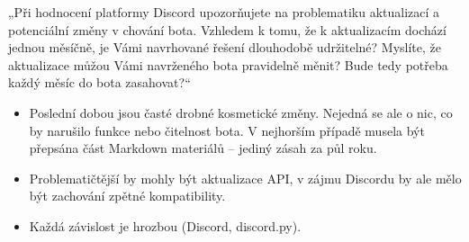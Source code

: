 \documentclass[FM]{tulpresentation}
\begin{document}
	\begin{frame}
		\bigskip
		„Při hodnocení platformy Discord upozorňujete na problematiku aktualizací a potenciální změny v chování
		bota. Vzhledem k tomu, že k aktualizacím dochází jednou měsíčně, je Vámi navrhované řešení dlouhodobě
		udržitelné? Myslíte, že aktualizace můžou Vámi navrženého bota pravidelně měnit? Bude tedy potřeba každý
		měsíc do bota zasahovat?“
		\bigskip
		\begin{itemize}
			\item Poslední dobou jsou časté drobné kosmetické změny. Nejedná se ale o nic, co by narušilo funkce nebo čitelnost bota. V nejhorším případě musela být přepsána část Markdown materiálů – jediný zásah za půl roku.
			\item Problematičtější by mohly být aktualizace API, v zájmu Discordu by ale mělo být zachování zpětné kompatibility.
			\item Každá závislost je hrozbou (Discord, discord.py).
		\end{itemize}
	\end{frame}
	
\end{document}
